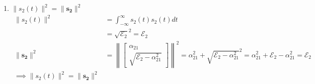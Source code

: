 \documentclass{article}
\begin{document}
\begin{enumerate}[label=2.\arabic*]
\begin{enumerate}[label=\alph*.]
        \item $\|s_2(t)\|^2 = \|\mathbf{s_2}\|^2$
        \begin{align*}
            \|s_2(t)\|^2 &= \int_{-\infty}^{\infty} s_2(t) s_2(t) dt \\
            &= \sqrt{\mathcal{E}_2}^2 = \mathcal{E}_2 \\
            \|\mathbf{s_2}\|^2 &= \left\|\begin{bmatrix}
                \alpha_{21} \\
                \sqrt{\mathcal{E}_2 - \alpha_{21}^2}
            \end{bmatrix}\right\|^2 = \alpha_{21}^2 + \sqrt{\mathcal{E}_2 - \alpha_{21}^2}^2 = \alpha_{21}^2 + \mathcal{E}_2 - \alpha_{21}^2 = \mathcal{E}_2 \\
            \implies \|s_2(t)\|^2 = \|\mathbf{s_2}\|^2
        \end{align*}


\end{enumerate}
\end{enumerate}
\end{document}
